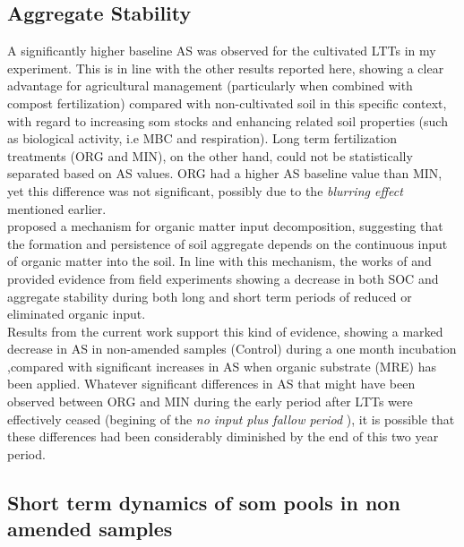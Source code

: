 	\subsection{Aggregate Stability}
	A significantly higher baseline AS was observed for the cultivated LTTs in my experiment. This is in line with the other results reported here, showing a clear advantage for agricultural management (particularly when combined with compost fertilization) compared with non-cultivated soil in this specific context, with regard to increasing \gls{som} stocks and enhancing related soil properties (such as biological activity, i.e MBC and respiration). Long term fertilization treatments (ORG and MIN), on the other hand, could not be statistically separated based on AS values. ORG had a higher AS baseline value than MIN, yet this difference was not significant, possibly due to the \textit{blurring effect} mentioned earlier. \\
	\citep{golchin1994} proposed a mechanism for organic matter input decomposition, suggesting that the formation and persistence of soil aggregate depends on the continuous input of organic matter into the soil. In line with this mechanism, the works of \citep{li2007} and \citep{redmile-gordon2020} provided evidence from field experiments showing a decrease in both SOC and aggregate stability during both long and short term periods of reduced or eliminated organic input.\\
	Results from the current work support this kind of evidence, showing  a marked decrease in AS in non-amended samples (Control) during a one month incubation ,compared with significant increases in AS when organic substrate (MRE) has been applied.
	Whatever significant differences in AS that might have been observed between ORG and MIN during the early period after LTTs were  effectively ceased (begining of the \textit{no input plus fallow period} ), it is  possible that these differences had been considerably diminished by the end of this two year period.\\

	\subsection{Short term dynamics of \gls{som} pools in non amended samples}\hypertarget{subsection_4.2.2}{}

